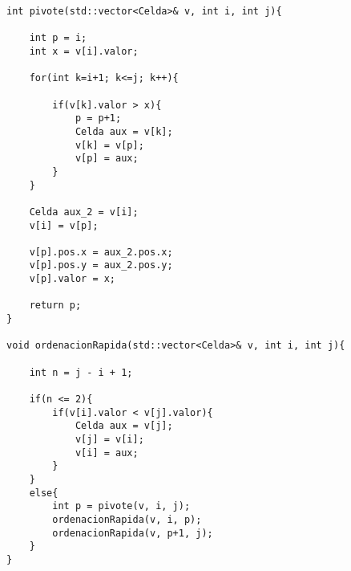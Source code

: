 \begin{lstlisting}
int pivote(std::vector<Celda>& v, int i, int j){

	int p = i;
	int x = v[i].valor;

	for(int k=i+1; k<=j; k++){	
		
		if(v[k].valor > x){
			p = p+1;
			Celda aux = v[k];
			v[k] = v[p];
			v[p] = aux;
		}
	}
	
	Celda aux_2 = v[i];
	v[i] = v[p];	
	
	v[p].pos.x = aux_2.pos.x;
	v[p].pos.y = aux_2.pos.y;
	v[p].valor = x;
		
	return p;
}

void ordenacionRapida(std::vector<Celda>& v, int i, int j){
	
	int n = j - i + 1;
	
	if(n <= 2){
		if(v[i].valor < v[j].valor){
			Celda aux = v[j];
			v[j] = v[i];
			v[i] = aux;
		}
	}
	else{
		int p = pivote(v, i, j);
		ordenacionRapida(v, i, p);
		ordenacionRapida(v, p+1, j);
	} 
}
\end{lstlisting}